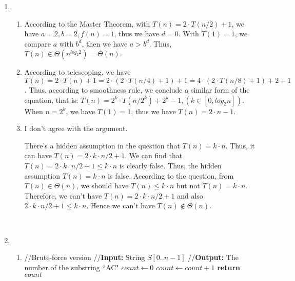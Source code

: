 \documentclass[11pt]{article}
\begin{document}
\begin{enumerate}
\item

\begin{enumerate}
\item
According to the Master Theorem, with $T(n)=2\cdot T(n/2)+1$,
we have $a=2, b=2, f(n)=1$, thus we have $d=0$. With $T(1)=1$, 
we compare $a$ with $b^d$, then we have $a>b^d$. Thus, $T(n) \in \Theta(n^{log_2 2})=\Theta(n)$.

\item
According to telescoping, 
we have $T(n)=2\cdot T(n)+1=2\cdot (2\cdot T(n/4)+1)+1=4\cdot (2\cdot T(n/8)+1)+2+1$. 
Thus, according to smoothness rule, we conclude a similar form of the equation, 
that is: $T(n)=2^k\cdot T(n/2^k)+2^k-1, (k \in [0, {log_2 n}])$. When $n=2^k$, 
we have $T(1)=1$, thus we have $T(n)=2\cdot n-1$.
\item
I don't agree with the argument.

There's a hidden assumption in the question that $T(n)=k\cdot n$. 
Thus, it can have $T(n)=2\cdot k \cdot n/2+1$. 
We can find that $T(n)=2\cdot k \cdot n/2+1 \leq k \cdot n$ is clearly false. 
Thus, the hidden assumption $T(n)=k\cdot n$ is false. According to the question, 
from $T(n)\in \Theta(n)$, we should have $T(n)\leq k\cdot n$ but not $T(n)=k\cdot n$. 
Therefore, we can't have $T(n)=2\cdot k \cdot n/2+1$ and also $2\cdot k \cdot n/2+1 \leq k\cdot n$. 
Hence we can't have $T(n)\notin \Theta(n)$.
~
\end{enumerate}
~
\item
\begin{enumerate}
\item
\begin{algorithmic}[1]
	\State //Brute-force version
	\State //\textbf{Input:} String $S[0..n-1]$
	\State //\textbf{Output:} The number of the substring \textquotedblleft AC"
	\State $count\gets 0$
					\State $count\gets count+1$
				\EndIf
			\EndFor
		\EndIf
	\EndFor
	\State \textbf{return} $count$
\EndFunction
\end{algorithmic}
~



\end{enumerate}
\end{enumerate}
\end{document}
